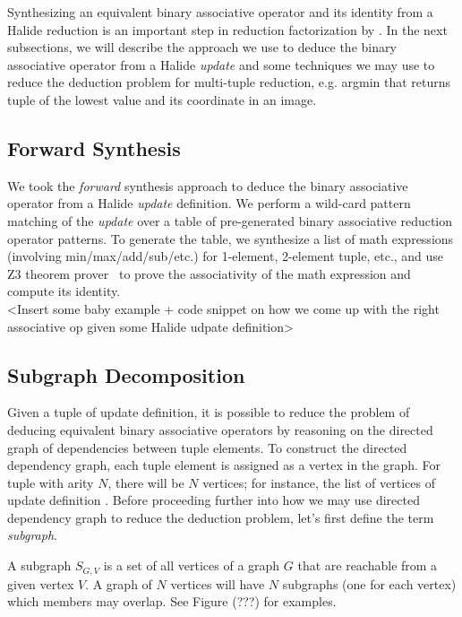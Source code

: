 Synthesizing an equivalent binary associative operator and its identity from a Halide reduction is an important step in reduction factorization by . In the next subsections, we will describe the approach we use to deduce the binary associative operator from a Halide \emph{update} and some techniques we may use to reduce the deduction problem for multi-tuple reduction, e.g. argmin that returns tuple of the lowest value and its coordinate in an image.

\subsection{Forward Synthesis}

We took the \emph{forward} synthesis approach to deduce the binary associative operator from a Halide \emph{update} definition. We perform a wild-card pattern matching of the \emph{update} over a table of pre-generated binary associative reduction operator patterns. To generate the table, we synthesize a list of math expressions (involving min/max/add/sub/etc.) for 1-element, 2-element tuple, etc., and use Z3 theorem prover~\cite{DeMoura:2008:ZES:1792734.1792766} to prove the associativity of the math expression and compute its identity. \\

<Insert some baby example + code snippet on how we come up with the right associative op given some Halide udpate definition> \\

\subsection{Subgraph Decomposition}

Given a tuple of update definition, it is possible to reduce the problem of deducing equivalent binary associative operators by reasoning on the directed graph of dependencies between tuple elements. To construct the directed dependency graph, each tuple element is assigned as a vertex in the graph. For tuple with arity $N$, there will be $N$ vertices; for instance, the list of vertices of update definition . Before proceeding further into how we may use directed dependency graph to reduce the deduction problem, let's first define the term \emph{subgraph}. 

\begin{definition}
A subgraph $S_{G,V}$ is a set of all vertices of a graph $G$ that are reachable from a given vertex $V$. A graph of $N$ vertices will have $N$ subgraphs (one for each vertex) which members may overlap. See Figure (???) for examples. 
\end{definition}

